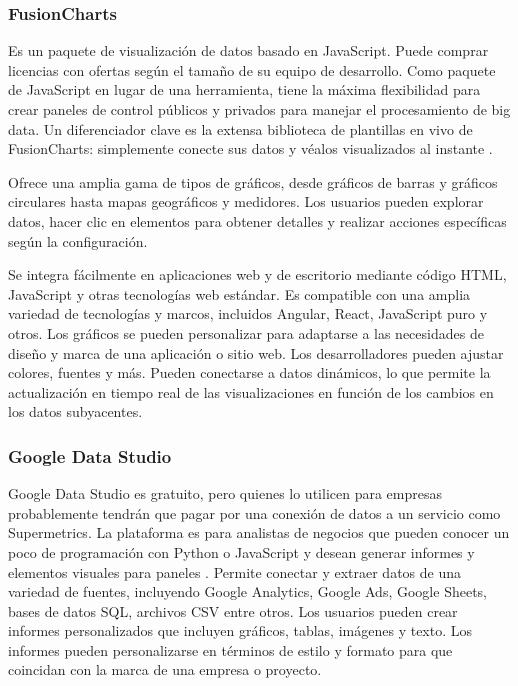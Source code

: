 \documentclass[
  11pt,
  bookmarksnumbered]{article}
\begin{document}
\hypertarget{fusioncharts}{%
\subsubsection{FusionCharts}\label{fusioncharts}}

Es un paquete de visualización de datos basado en JavaScript.
Puede comprar licencias con ofertas según el tamaño de su equipo de desarrollo.
Como paquete de JavaScript en lugar de una herramienta, tiene la máxima flexibilidad para crear paneles de control públicos y privados para manejar el procesamiento de big data.
Un diferenciador clave es la extensa biblioteca de plantillas en vivo de FusionCharts: simplemente conecte sus datos y véalos visualizados al instante \textcite{upwork2023best}.

Ofrece una amplia gama de tipos de gráficos, desde gráficos de barras y gráficos circulares hasta mapas geográficos y medidores.
Los usuarios pueden explorar datos, hacer clic en elementos para obtener detalles y realizar acciones específicas según la configuración.

Se integra fácilmente en aplicaciones web y de escritorio mediante código HTML, JavaScript y otras tecnologías web estándar.
Es compatible con una amplia variedad de tecnologías y marcos, incluidos Angular, React, JavaScript puro y otros.
Los gráficos se pueden personalizar para adaptarse a las necesidades de diseño y marca de una aplicación o sitio web.
Los desarrolladores pueden ajustar colores, fuentes y más.
Pueden conectarse a datos dinámicos, lo que permite la actualización en tiempo real de las visualizaciones en función de los cambios en los datos subyacentes.

\hypertarget{google-data-studio}{%
\subsubsection{Google Data Studio}\label{google-data-studio}}

Google Data Studio es gratuito, pero quienes lo utilicen para empresas probablemente tendrán que pagar por una conexión de datos a un servicio como Supermetrics.
La plataforma es para analistas de negocios que pueden conocer un poco de programación con Python o JavaScript y desean generar informes y elementos visuales para paneles \textcite{upwork2023best}.
Permite conectar y extraer datos de una variedad de fuentes, incluyendo Google Analytics, Google Ads, Google Sheets, bases de datos SQL, archivos CSV entre otros.
Los usuarios pueden crear informes personalizados que incluyen gráficos, tablas, imágenes y texto.
Los informes pueden personalizarse en términos de estilo y formato para que coincidan con la marca de una empresa o proyecto.
\end{document}
